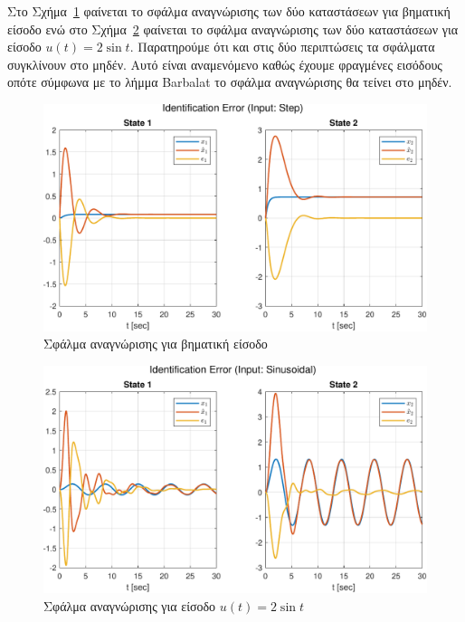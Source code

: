 \documentclass[a4paper,12pt]{article}
\begin{document}
Στο Σχήμα~\ref{fig:task1_identification_error_step} φαίνεται το σφάλμα αναγνώρισης των δύο καταστάσεων
για βηματική είσοδο ενώ στο Σχήμα~\ref{fig:task1_identification_error_sinusoidal} φαίνεται το σφάλμα
αναγνώρισης των δύο καταστάσεων για είσοδο $u(t) = 2 \sin t$. Παρατηρούμε ότι και στις δύο περιπτώσεις
τα σφάλματα συγκλίνουν στο μηδέν. Αυτό είναι αναμενόμενο καθώς έχουμε φραγμένες εισόδους οπότε σύμφωνα
με το λήμμα Barbalat το σφάλμα αναγνώρισης θα τείνει στο μηδέν.

\begin{figure}
    \centering
    \includegraphics[width=1\linewidth]{plot/task1_identification_error_step.pdf}
    \caption{Σφάλμα αναγνώρισης για βηματική είσοδο}
    \label{fig:task1_identification_error_step}
\end{figure}

\begin{figure}
    \centering
    \includegraphics[width=1\linewidth]{plot/task1_identification_error_sinusoidal.pdf}
    \caption{Σφάλμα αναγνώρισης για είσοδο $u(t) = 2 \sin t$}
    \label{fig:task1_identification_error_sinusoidal}
\end{figure}
\end{document}
